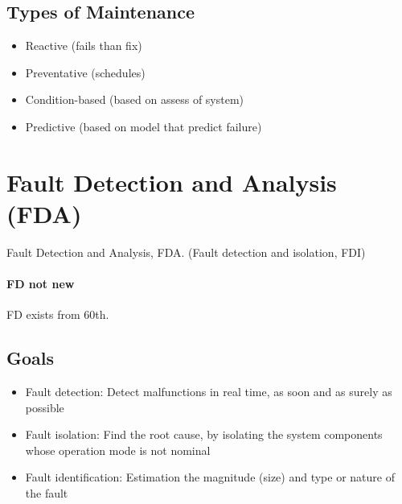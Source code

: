 \subsection{Types of Maintenance}
\begin{itemize}
    \item{Reactive (fails than fix)}
    \item{Preventative (schedules)}
    \item{Condition-based (based on assess of system)}
    \item{Predictive (based on model that predict failure)}
\end{itemize}


% 

\section{Fault Detection and Analysis (FDA)}
Fault Detection and Analysis, FDA. (Fault detection and isolation, FDI) 

\paragraph{FD not new}
FD exists from 60th.

\subsection{Goals}

\begin{itemize}
    \item{Fault detection: Detect malfunctions in real time, as soon and as
        surely as possible}
    \item{Fault isolation: Find the root cause, by isolating the system
        components whose operation mode is not nominal}
    \item{Fault identification: Estimation the magnitude (size) and type or
            nature of the fault}
\end{itemize}



